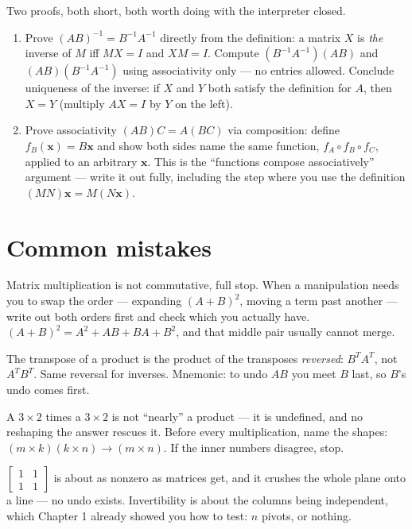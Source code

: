Two proofs, both short, both worth doing with the interpreter closed.
\begin{enumerate}
  \item Prove $(AB)^{-1}=B^{-1}A^{-1}$ directly from the definition: a matrix $X$ is \emph{the} inverse of $M$ iff $MX=I$ and $XM=I$. Compute $(B^{-1}A^{-1})(AB)$ and $(AB)(B^{-1}A^{-1})$ using associativity only — no entries allowed. Conclude uniqueness of the inverse: if $X$ and $Y$ both satisfy the definition for $A$, then $X=Y$ (multiply $AX=I$ by $Y$ on the left).
  \item Prove associativity $(AB)C=A(BC)$ via composition: define $f_B(\mathbf{x})=B\mathbf{x}$ and show both sides name the same function, $f_A\circ f_B\circ f_C$, applied to an arbitrary $\mathbf{x}$. This is the ``functions compose associatively'' argument — write it out fully, including the step where you use the definition $(MN)\mathbf{x}=M(N\mathbf{x})$.
\end{enumerate}

\section{Common mistakes}\label{sec:mistakes2}

\begin{tripwire}[Assuming $AB=BA$]
Matrix multiplication is not commutative, full stop. When a manipulation needs you to swap the order — expanding $(A+B)^2$, moving a term past another — write out both orders first and check which you actually have. $(A+B)^2=A^2+AB+BA+B^2$, and that middle pair usually cannot merge.
\end{tripwire}
\begin{tripwire}
The transpose of a product is the product of the transposes \emph{reversed}: $B^{T}A^{T}$, not $A^{T}B^{T}$. Same reversal for inverses. Mnemonic: to undo $AB$ you meet $B$ last, so $B$'s undo comes first.
\end{tripwire}
\begin{tripwire}
A $3\times2$ times a $3\times2$ is not ``nearly'' a product — it is undefined, and no reshaping the answer rescues it. Before every multiplication, name the shapes: $(m\times k)(k\times n)\to(m\times n)$. If the inner numbers disagree, stop.
\end{tripwire}
\begin{tripwire}
$\begin{bmatrix}1&1\\1&1\end{bmatrix}$ is about as nonzero as matrices get, and it crushes the whole plane onto a line — no undo exists. Invertibility is about the columns being independent, which Chapter 1 already showed you how to test: $n$ pivots, or nothing.
\end{tripwire}

